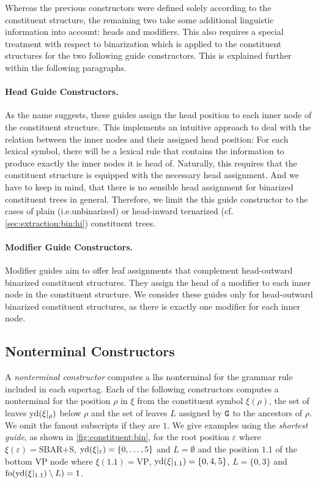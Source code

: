 \documentclass[../../document.tex]{subfiles}
\begin{document}
    Whereas the previous constructors were defined solely according to the constituent structure, the remaining two take some additional linguistic information into account: heads and modifiers.
    This also requires a special treatment with respect to binarization which is applied to the constituent structures for the two following guide constructors.
    This is explained further within the following paragraphs.

    \paragraph{Head Guide Constructors.}
    As the name suggests, these guides assign the head position to each inner node of the constituent structure.
    This implements an intuitive approach to deal with the relation between the inner nodes and their assigned head position: For each lexical symbol, there will be a lexical rule that contains the information to produce exactly the inner nodes it is head of.
    Naturally, this requires that the constituent structure is equipped with the necessary head assignment.
    And we have to keep in mind, that there is no sensible head assignment for binarized constituent trees in general.
    Therefore, we limit the this guide constructor to the cases of plain (i.e.\@ unbinarized) or head-inward ternarized (cf.\@ \cref{sec:extraction:bin:hi}) constituent trees.

    \paragraph{Modifier Guide Constructors.}
    Modifier guides aim to offer leaf assignments that complement head-outward binarized constituent structures.
    They assign the head of a modifier to each inner node in the constituent structure.
    We consider these guides only for head-outward binarized constituent structures, as there is exactly one modifier for each inner node.

    \subsection{Nonterminal Constructors}
    A \emph{nonterminal constructor} computes a lhs nonterminal for the grammar rule included in each supertag.
    Each of the following constructors computes a nonterminal for the position \(\rho\) in \(\xi\) from the constituent symbol \(\xi(\rho)\), the set of leaves \(\operatorname{yd}(\xi|_\rho)\) below \(\rho\) and the set of leaves \(L\) assigned by \(\texttt{G}\) to the ancestors of \(\rho\).
    We omit the fanout subscripts if they are \(1\).
    We give examples using the \emph{shortest guide}, as shown in \cref{fig:constituent:bin}, for the root position \(\varepsilon\) where \(\xi(\varepsilon) = \text{SBAR+S}\), \(\operatorname{yd}(\xi|_\varepsilon) = \{0,\ldots,5\}\) and \(L = \emptyset\) and the position \(1.1\) of the bottom VP node where \(\xi(1.1) = \text{VP}\), \(\operatorname{yd}(\xi|_{1.1}) = \{0,4,5\}\), \(L = \{0,3\}\) and \(\operatorname{fo}(\operatorname{yd}(\xi|_{1.1}) \setminus L) = 1\).
\end{document}
